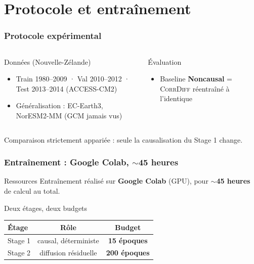 \documentclass[11pt]{beamer}
\newcommand{\CorrDiff}{\textsc{CorrDiff}}
\begin{document}
\section{Protocole et entraînement}

\begin{frame}
\frametitle{Protocole expérimental}
\begin{columns}[T]
\begin{block}{Données (Nouvelle-Zélande)}
\footnotesize
\begin{itemize}
  \item Train 1980--2009 · Val 2010--2012 · Test 2013--2014 (ACCESS-CM2)
  \item Généralisation : EC-Earth3, NorESM2-MM (GCM jamais vus)
\end{itemize}
\end{block}

\begin{block}{Évaluation}
\footnotesize
\begin{itemize}
  \item Baseline \textbf{Noncausal} = \CorrDiff{} réentraîné à l'identique
\end{itemize}
\end{block}
\end{columns}
\vspace{2mm}
\begin{block}{}
  \centering\small Comparaison strictement appariée : seule la causalisation du Stage 1 change.
\end{block}
\end{frame}

\begin{frame}
\frametitle{Entraînement : Google Colab, $\sim$45 heures}
\vfill
\begin{block}{Ressources}
\footnotesize
Entraînement réalisé sur \textbf{Google Colab} (GPU), pour \textbf{$\sim$45 heures} de calcul au total.
\end{block}
\vfill
\begin{block}{Deux étages, deux budgets}
\centering
\renewcommand{\arraystretch}{1.3}
\begin{tabular}{lcc}
\toprule
\textbf{Étage} & \textbf{Rôle} & \textbf{Budget} \\
\midrule
Stage 1 & causal, déterministe & \textbf{15 époques} \\
Stage 2 & diffusion résiduelle & \textbf{200 époques} \\
\bottomrule
\end{tabular}
\end{block}
\vfill
\end{frame}
\end{document}
